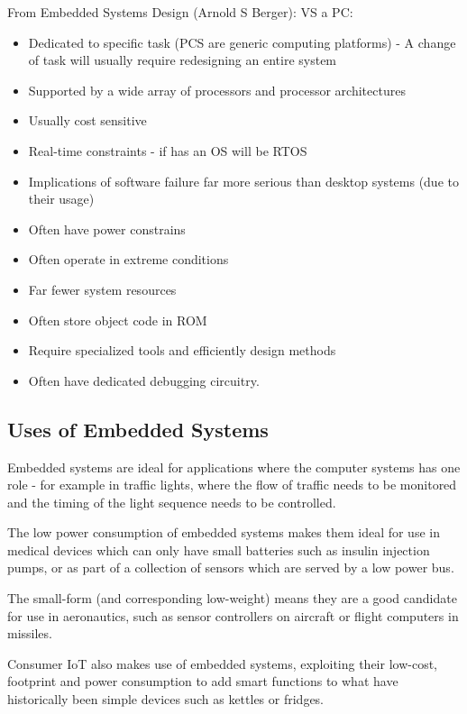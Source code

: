 From Embedded Systems Design (Arnold S Berger):
VS a PC:
\begin{itemize}
\item Dedicated to specific task (PCS are generic computing platforms) - A change of task will usually require redesigning an entire system
\item Supported by a wide array of processors and processor architectures
\item Usually cost sensitive
\item Real-time constraints - if has an OS will be RTOS
\item Implications of software failure far more serious than desktop systems (due to their usage)
\item Often have power constrains
\item Often operate in extreme conditions
\item Far fewer system resources
\item Often store object code in ROM
\item Require specialized tools and efficiently design methods
\item Often have dedicated debugging circuitry.
\end{itemize}




\subsection{Uses of Embedded Systems}\label{usesEmbeddedSystems}

Embedded systems are ideal for applications where the computer systems has one role - for example in traffic lights, where the flow of traffic needs to be monitored and the timing of the light sequence needs to be controlled.

The low power consumption of embedded systems makes them ideal for use in medical devices which can only have small batteries such as insulin injection pumps, or as part of a collection of sensors which are served by a low power bus.

The small-form (and corresponding low-weight) means they are a good candidate for use in aeronautics, such as sensor controllers on aircraft or flight computers in missiles.

Consumer IoT also makes use of embedded systems, exploiting their low-cost, footprint and power consumption to add smart functions to what have historically been simple devices such as kettles or fridges.

